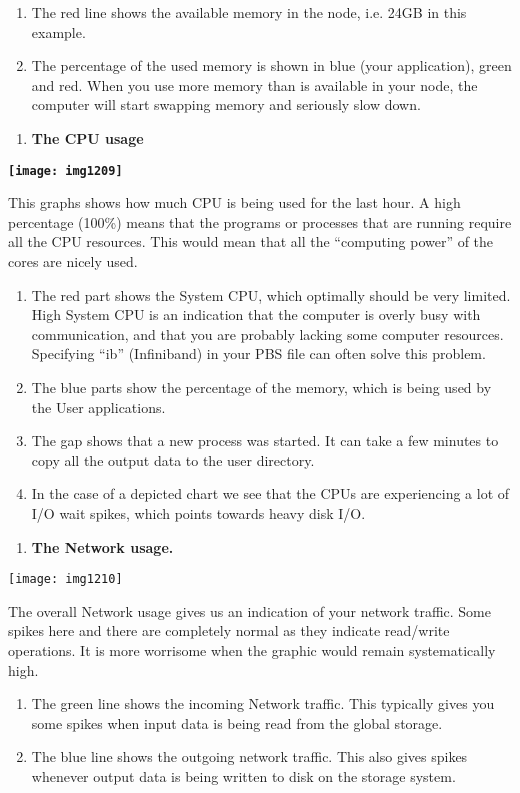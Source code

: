 \begin{enumerate}
\item  The red line shows the available memory in the node, i.e. 24GB in this example.
\item  The percentage of the used memory is shown in blue (your application), green and red.  When you use more memory than is available in your node, the computer will start swapping memory and seriously slow down.
\end{enumerate}

\begin{enumerate}
\item  \textbf{The CPU usage}
\end{enumerate}

\textbf{\texttt{[image: img1209]}}

This graphs shows how much CPU is being used for the last hour. A high percentage (100\%) means that the programs or processes that are running require all the CPU resources. This would mean that all the ``computing power'' of the cores are nicely used.

\begin{enumerate}
\item  The red part shows the System CPU, which optimally should be very limited. High System CPU is an indication that the computer is overly busy with communication, and that you are probably lacking some computer resources.  Specifying ``ib'' (Infiniband) in your PBS file can often solve this problem.
\item  The blue parts show the percentage of the memory, which is being used by the User applications.
\item  The gap shows that a new process was started. It can take a few minutes to copy all the output data to the user directory.
\item  In the case of a depicted chart we see that the CPUs are experiencing a lot of I/O wait spikes, which points towards heavy disk I/O.
\end{enumerate}

\begin{enumerate}
\item \textbf{ The Network usage.}
\end{enumerate}

\texttt{[image: img1210]}


The overall Network usage gives us an indication of your network traffic. Some spikes here and there are completely normal as they indicate read/write operations. It is more worrisome when the graphic would remain systematically high.

\begin{enumerate}
\item  The green line shows the incoming Network traffic. This typically gives you some spikes when input data is being read from the global storage.
\item  The blue line shows the outgoing network traffic. This also gives spikes whenever output data is being written to disk on the storage system.
\end{enumerate}

